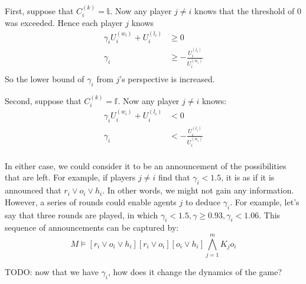 \documentclass[a4paper,10pt]{article}
\begin{document}
First, suppose that $C^{(k)}_i = \mathbb{t}$. Now any player $j\neq i$ knows that the threshold of 0 was exceeded. Hence each player $j$ knows 
\begin{align*}
\gamma_i U^{(w_i)}_i + U^{(l_i)}_i &\geq 0\\
\gamma_i &\geq -\frac{U^{(l_i)}_i }{U^{(w_i)}_i}\\
\end{align*}
So the lower bound of $\gamma_i$ from $j$'s perspective is increased.

Second, suppose that $C^{(k)}_i = \mathbb{f}$. Now any player $j\neq i$ knows:
\begin{align*}
\gamma_i U^{(w_i)}_i + U^{(l_i)}_i &< 0\\
\gamma_i &< -\frac{U^{(l_i)}_i }{U^{(w_i)}_i}\\
\end{align*}

In either case, we could consider it to be an announcement of the possibilities that are left. For example, if players $j\neq i$ find that $\gamma_i < 1.5$, it is as if it is announced that $r_i \vee o_i \vee h_i$. In other words, we might not gain any information. However, a series of rounds could enable agents $j$ to deduce $\gamma_i$. For example, let's say that three rounds are played, in which $\gamma_i < 1.5,\gamma \geq 0.93,\gamma_i < 1.06$. This sequence of announcements can be captured by:
\begin{equation*}
M\models [r_i \vee o_i \vee h_i][r_i \vee o_i][o_i \vee h_i] \bigwedge_{j=1}^m K_j o_i
\end{equation*}

TODO: now that we have $\gamma_i$, how does it change the dynamics of the game?

\begin{comment}
\begin{figure}[!h]
 \centering
\begin{tikzpicture}
  \node [mystate] (a) at (0,0) {$\bullet$};
  \node [mystate] (b) at (5,0) {$\bullet$};
  \draw (a) node[below] {$\neg p, q, \neg r$};
  \draw (b) node[below] {$p, q, r$};
  \draw (a) node[above] {$w_1$};
  \draw (b) node[above] {$w_2$};
  \draw (a) to node[below] {$b$} (b);
\end{tikzpicture}
\caption{Simple world}
\label{fig:wrld}
\end{figure}
\end{comment}
\end{document}
